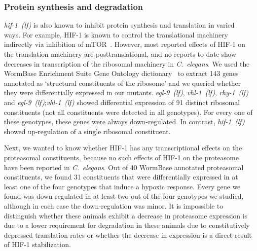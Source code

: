 \documentclass[9pt,twocolumn,twoside]{pnas-new}
\newcommand{\cel}{\emph{C.~elegans}}
\newcommand{\egl}{\emph{egl-9~(lf)}}
\newcommand{\rhy}{\emph{rhy-1~(lf)}}
\newcommand{\vhl}{\emph{vhl-1~(lf)}}
\newcommand{\hif}{\emph{hif-1~(lf)}}
\newcommand{\hifp}{HIF-1}
\begin{document}
\subsubsection{Protein synthesis and degradation}

\hif{} is also known to inhibit protein synthesis and translation in varied ways.
For example, \hifp{} is known to control the translational machinery indirectly
via inhibition of mTOR~\cite{Brugarolas2004}. However, most reported effects of
\hifp{} on the translation machinery are posttranslational, and no reports to date
show decreases in transcription of the ribosomal machinery in \cel{}. We used
the WormBase Enrichment Suite Gene Ontology dictionary~\cite{} to extract 143 genes
annotated as `structural constituents of the ribosome' and we queried whether they
were differentially expressed in our mutants. \egl{}, \vhl{}, \rhy{} and
\egl{};\vhl{} showed differential expression of 91 distinct ribosomal
constituents (not all constituents were detected in all genotypes). For every one
of these genotypes, these genes were always down-regulated. In contrast,
\hif{} showed up-regulation of a single ribosomal constituent.

Next, we wanted to know whether \hifp{} has any transcriptional effects on the
proteasomal constituents, because no such effects of \hifp{} on the proteasome
have been reported in \cel{}. Out of 40 WormBase annotated proteasomal constituents,
we found 31 constituents that were differentially expressed in at least one of the
four genotypes that induce a hypoxic response. Every gene we found was down-regulated
in at least two out of the four genotypes we studied, although in each case the
down-regulation was minor. It is impossible to distinguish whether these animals
exhibit a decrease in proteasome expression is due to a lower requirement for
degradation in these animals due to constitutively depressed translation rates or
whether the decrease in expression is a direct result of \hifp{} stabilization.

\end{document}
